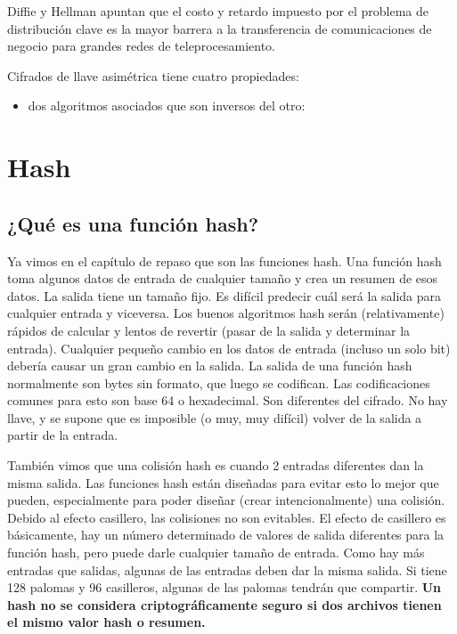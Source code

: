Diffie y Hellman apuntan que el costo y retardo impuesto por el problema de distribución clave es la mayor barrera a la transferencia de comunicaciones de negocio para grandes redes de teleprocesamiento. 

Cifrados de llave asimétrica tiene cuatro propiedades:
\begin{itemize}
    \item dos algoritmos asociados que son inversos del otro: 
\end{itemize}





\newpage
\section{Hash}
\subsection{¿Qué es una función hash?}
Ya vimos en el capítulo de repaso que son las funciones hash. 
%
Una función hash toma algunos datos de entrada de cualquier tamaño y crea un resumen de esos datos. La salida tiene un tamaño fijo. Es difícil predecir cuál será la salida para cualquier entrada y viceversa. Los buenos algoritmos hash serán (relativamente) rápidos de calcular y lentos de revertir (pasar de la salida y determinar la entrada). Cualquier pequeño cambio en los datos de entrada (incluso un solo bit) debería causar un gran cambio en la salida.
%
La salida de una función hash normalmente son bytes sin formato, que luego se codifican. Las codificaciones comunes para esto son base 64 o hexadecimal. Son  diferentes del cifrado. No hay llave, y se supone que es imposible (o muy, muy difícil) volver de la salida a partir de la entrada.

También vimos que una colisión hash es cuando 2 entradas diferentes dan la misma salida. Las funciones hash están diseñadas para evitar esto lo mejor que pueden, especialmente para poder diseñar (crear intencionalmente) una colisión. Debido al efecto casillero, las colisiones no son evitables. El efecto de casillero es básicamente, hay un número determinado de valores de salida diferentes para la función hash, pero puede darle cualquier tamaño de entrada. Como hay más entradas que salidas, algunas de las entradas deben dar la misma salida. Si tiene 128 palomas y 96 casilleros, algunas de las palomas tendrán que compartir.
\textbf{Un hash no se considera criptográficamente seguro si dos archivos tienen el mismo valor hash o resumen.}


